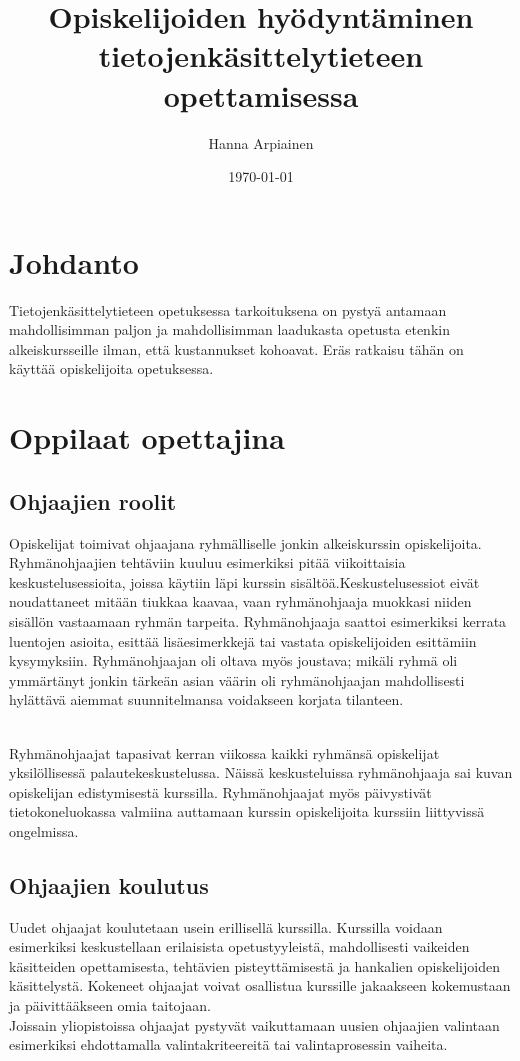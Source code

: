 \documentclass[finnish]{tktltiki2}
\title{﻿Opiskelijoiden hyödyntäminen tietojenkäsittelytieteen opettamisessa}
\author{Hanna Arpiainen}
\date{\today}
\theoremstyle{definition}
\theoremstyle{remark}
\begin{document}
\maketitle
\makeabstract

\tableofcontents
\newpage



\section{Johdanto}
Tietojenkäsittelytieteen opetuksessa tarkoituksena on pystyä antamaan mahdollisimman paljon ja mahdollisimman laadukasta opetusta etenkin alkeiskursseille ilman, että kustannukset kohoavat. Eräs ratkaisu tähän on käyttää opiskelijoita opetuksessa.\cite{Reges:1988:EUU:52965.52971}





\section{Oppilaat opettajina}

\subsection{Ohjaajien roolit}
Opiskelijat toimivat ohjaajana ryhmälliselle jonkin alkeiskurssin opiskelijoita. Ryhmänohjaajien tehtäviin kuuluu esimerkiksi pitää viikoittaisia keskustelusessioita, joissa käytiin läpi kurssin sisältöä.Keskustelusessiot eivät noudattaneet mitään tiukkaa kaavaa, vaan ryhmänohjaaja muokkasi niiden sisällön vastaamaan ryhmän tarpeita. Ryhmänohjaaja saattoi esimerkiksi kerrata luentojen asioita, esittää lisäesimerkkejä tai vastata opiskelijoiden esittämiin kysymyksiin. Ryhmänohjaajan oli oltava myös joustava; mikäli ryhmä oli ymmärtänyt jonkin tärkeän asian väärin oli ryhmänohjaajan mahdollisesti hylättävä aiemmat suunnitelmansa voidakseen korjata tilanteen.

\\

Ryhmänohjaajat tapasivat kerran viikossa kaikki ryhmänsä opiskelijat yksilöllisessä palautekeskustelussa. Näissä keskusteluissa ryhmänohjaaja sai kuvan opiskelijan edistymisestä kurssilla. Ryhmänohjaajat myös päivystivät tietokoneluokassa valmiina auttamaan kurssin opiskelijoita kurssiin liittyvissä ongelmissa.



\subsection{Ohjaajien koulutus}
Uudet ohjaajat koulutetaan usein erillisellä kurssilla. Kurssilla voidaan esimerkiksi keskustellaan erilaisista opetustyyleistä, mahdollisesti vaikeiden käsitteiden opettamisesta, tehtävien pisteyttämisestä ja hankalien opiskelijoiden käsittelystä. Kokeneet ohjaajat voivat osallistua kurssille jakaakseen kokemustaan ja päivittääkseen omia taitojaan.
\\
Joissain yliopistoissa ohjaajat pystyvät vaikuttamaan uusien ohjaajien valintaan esimerkiksi ehdottamalla valintakriteereitä tai valintaprosessin vaiheita.
\end{document}
